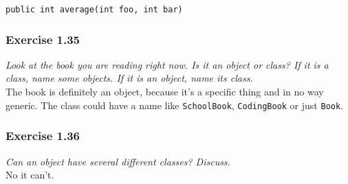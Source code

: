 \lstinline{public int average(int foo, int bar)}

\subsubsection*{Exercise 1.35}
\textit{Look at the book you are reading right now. Is it an object or class?
	If it is a class, name some objects. If it is an object, name its 
	class.}\\

The book is definitely an object, because it's a specific thing and in no way 
generic. The class could have a name like \lstinline{SchoolBook}, 
\lstinline{CodingBook} or just \lstinline{Book}.

\subsubsection*{Exercise 1.36}
\textit{Can an object have several different classes? Discuss.}\\

No it can't.
